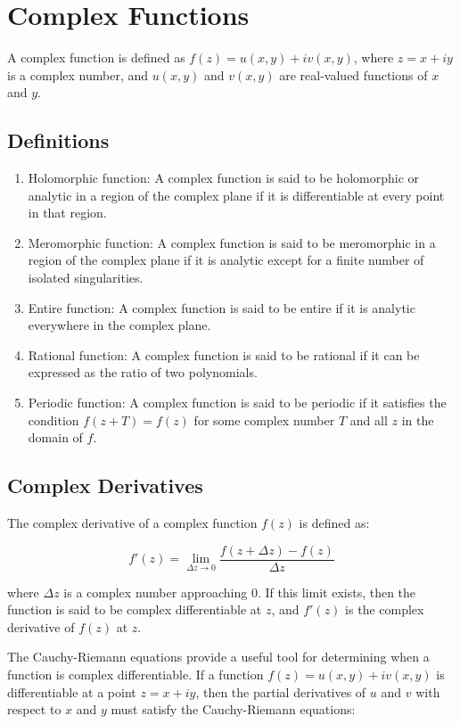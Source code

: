 \documentclass{article}
\begin{document}
    
\section{Complex Functions}
A complex function is defined as $f(z) = u(x,y) + iv(x,y)$, where $z = x + iy$
is a complex number, and $u(x,y)$ and $v(x,y)$ are real-valued functions of $x$
and $y$.

\subsection{Definitions}
\begin{enumerate}
\item Holomorphic function: A complex function is said to be holomorphic or analytic in a region of the complex plane if it is differentiable at every point in that region.
\item Meromorphic function: A complex function is said to be meromorphic in a region of the complex plane if it is analytic except for a finite number of isolated singularities.
\item Entire function: A complex function is said to be entire if it is analytic everywhere in the complex plane.
\item Rational function: A complex function is said to be rational if it can be expressed as the ratio of two polynomials.
\item Periodic function: A complex function is said to be periodic if it satisfies the condition $f(z + T) = f(z)$ for some complex number $T$ and all $z$ in the domain of $f$.
\end{enumerate}

\subsection{Complex Derivatives}
The complex derivative of a complex function $f(z)$ is defined as:

\[
f'(z) = \lim\limits_{\Delta z \to 0} \frac{f(z + \Delta z) - f(z)}{\Delta z}
\]

where $\Delta z$ is a complex number approaching 0. If this limit exists, then
the function is said to be complex differentiable at $z$, and $f'(z)$ is the
complex derivative of $f(z)$ at $z$.

The Cauchy-Riemann equations provide a useful tool for determining when a
function is complex differentiable. If a function $f(z) = u(x,y) + iv(x,y)$ is
differentiable at a point $z = x + iy$, then the partial derivatives of $u$ and
$v$ with respect to $x$ and $y$ must satisfy the Cauchy-Riemann equations:
\end{document}
